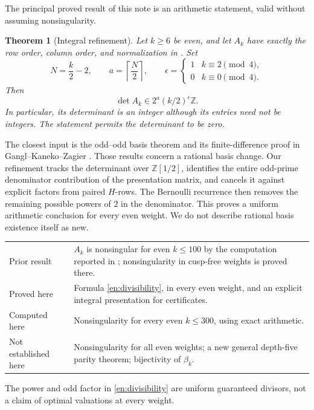 \documentclass[12pt]{amsart}
\newtheorem{thm}{Theorem}[section]
\theoremstyle{definition}
\theoremstyle{remark}
\numberwithin{equation}{section}
\newcommand{\Z}{\mathbb{Z}}
\theoremstyle{definition}
\theoremstyle{remark}
\begin{document}
The principal proved result of this note is an arithmetic statement,
valid without assuming nonsingularity.
\begin{thm}[Integral refinement]\label{en:main}
Let $k\geq6$ be even, and let $A_k$ have exactly the row order, column
order, and normalization in \cite[(5.28)--(5.31)]{BR}. Set
\[
 N=\frac{k}{2}-2,\qquad a=\left\lceil\frac N2\right\rceil,
 \qquad \epsilon=\begin{cases}1&k\equiv2\pmod4,\\0&k\equiv0\pmod4.
 \end{cases}
\]
Then
\begin{equation}\label{en:divisibility}
 \boxed{\det A_k\in 2^a(k/2)^\epsilon\Z.}
\end{equation}
In particular, its determinant is an integer although its entries need
not be integers. The statement permits the determinant to be zero.
\end{thm}

The closest input is the odd--odd basis theorem and its finite-difference
proof in Gangl--Kaneko--Zagier \cite[Theorem 2 and \S4,
Proposition 3]{GKZ}. Those results concern a rational basis change.
Our refinement tracks the determinant over $\Z[1/2]$, identifies the entire
odd-prime denominator contribution of the presentation matrix, and cancels
it against explicit factors from paired $H$-rows. The Bernoulli recurrence
then removes the remaining possible powers of $2$ in the denominator.
This proves a uniform arithmetic conclusion for every even weight.
We do not describe rational basis existence itself as new.

\begin{center}
\begin{tabular}{p{}p{}}
\toprule
Prior result & $A_k$ is nonsingular for even $k\leq100$ by the computation
reported in \cite{BR}; nonsingularity in cusp-free weights is proved there.\\
Proved here & Formula \eqref{en:divisibility}, in every even weight,
and an explicit integral presentation for certificates.\\
Computed here & Nonsingularity for every even $k\leq300$, using exact arithmetic.\\
Not established here & Nonsingularity for all even weights; a new general
depth-five parity theorem; bijectivity of $\beta_k$.\\
\bottomrule
\end{tabular}
\end{center}
The power and odd factor in \eqref{en:divisibility} are uniform guaranteed
divisors, not a claim of optimal valuations at every weight.
\end{document}
